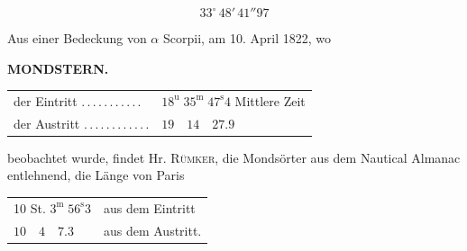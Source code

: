 \[
33^{\circ}\,48'\,41''97
\]

Aus einer Bedeckung von $\alpha$ Scorpii, am 10. April 1822, wo\par
\clearpage
\thispagestyle{empty}
\noindent{}%
\makebox[12mm][l]{}%
\parbox[t]{\dimexpr\linewidth-24mm\relax}{\centering\footnotesize\bfseries MONDSTERN.\par}%
\par\nobreak\medskip
\begin{center}
\small
\begin{tabular}{l l}
der Eintritt \mbox{.\,.\,.\,.\,.\,.\,.\,.\,.\,.\,.} & $18^{\mathrm{u}}\;35^{\mathrm{m}}\;47^{\mathrm{s}}4$ Mittlere Zeit \\
der Austritt \mbox{.\,.\,.\,.\,.\,.\,.\,.\,.\,.\,.\,.} & $19\quad14\quad27.9$
\end{tabular}
\end{center}

\noindent beobachtet wurde, findet Hr. \textsc{Rümker}, die Mondsörter aus dem Nautical Almanac entlehnend, die Länge von Paris
\begin{center}
\begin{tabular}{l l}
10 St. $3^{\mathrm{m}}\;56^{\mathrm{s}}3$ & aus dem Eintritt \\
$10\quad4\quad7.3$ & aus dem Austritt.
\end{tabular}
\end{center}
